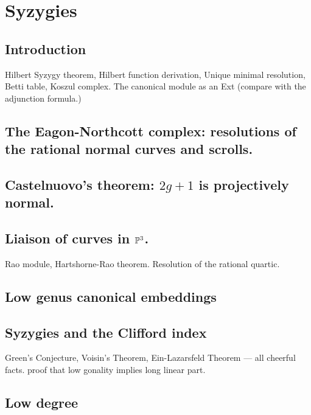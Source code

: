 

\chapter{Syzygies}
\label{SyzygiesChapter}

\section{Introduction} Hilbert Syzygy theorem, Hilbert function derivation, Unique minimal resolution, Betti table, Koszul complex. The canonical module as an Ext (compare with the adjunction formula.)

\section{The Eagon-Northcott complex: resolutions of the rational normal curves and scrolls.}

\section{Castelnuovo's theorem: $2g+1$ is projectively normal.}

\section{Liaison of curves in ${\mathbb P}^3$.}
Rao module, Hartshorne-Rao theorem. Resolution of the rational quartic.

\section{Low genus canonical embeddings}

\section{Syzygies and the Clifford index}
Green's Conjecture, Voisin's Theorem, Ein-Lazarsfeld Theorem --- all cheerful facts. proof that low gonality implies long linear part.

\section{Low degree}
